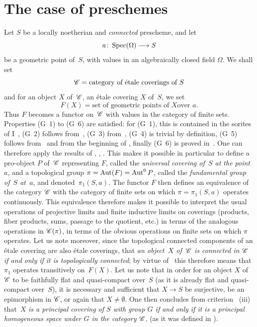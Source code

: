 \section{The case of preschemes}
\label{V.7}
Let $S$ be a locally noetherian and
\emph{connected} prescheme, and let
$$
a\colon \Spec(\Omega)\to S
$$
be a geometric point of~$S$, with values in an
algebraically closed field $\Omega$. We shall set
$$
\cal{C}=\text{category of \'etale coverings of~$S$}
$$
and for an object $X$ of~$\cal{C}$, \ie an \'etale covering
$X$ of~$S$, we set
$$
F(X)=\text{set of geometric points of~$X$
over~$a$.}
$$
Thus $F$ becomes a functor on~$\cal{C}$ with values in the
category of finite sets. Properties (G~1) to
(G~6) are satisfied: for (G~1), this is contained in the sorites of
I~, (G~2) follows from~, (G~3) from~,
(G~4) is trivial by definition, (G~5) follows from~ and
from the beginning of \No {}, finally (G~6) is proved in~. One
can therefore apply the results of \No {}, , . This makes it
possible in particular to define a pro-object $P$ of~$\cal{C}$
representing $F$, called the \emph{universal covering of~$S$
at the point~$a$},
and a topological group $\pi=\operatorname{Aut}(F)=\operatorname{Aut}^0 P$, called the
\emph{fundamental group of~$S$ at~$a$},
and denoted~$\pi_1(S,a)$.
The functor $F$ then defines an equivalence of the
category $\cal{C}$ with the category of finite sets
on which $\pi=\pi_1(S,a)$ operates continuously. This
equivalence therefore makes it possible to interpret the usual
operations of projective limits and finite inductive limits on
coverings (products, fiber products, sums, passage to the
quotient, etc.) in terms of the analogous operations in
$\cal{C}(\pi)$, \ie in terms of the obvious operations on
finite sets on which $\pi$ operates. Let us note moreover, since
the topological connected components of an \'etale covering
are also \'etale coverings, that \emph{an \hbox{object $X$} of~$\cal{C}$ is connected in $\cal{C}$ if and only if it is
topologically connected}; by virtue of~ this therefore means
that $\pi_1$ operates transitively on~$F(X)$.
Let us note that in order for an object $X$ of~$\cal{C}$ to be faithfully flat
and quasi-compact over~$S$ (as it is already flat and
quasi-compact over~$S$), it is necessary and sufficient that $X\to S$ be surjective,
\ie be an epimorphism in $\cal{C}$, or again that $X\neq
\emptyset$. One then concludes from criterion ~(iii) that~$X$
\emph{is a principal covering of
$S$
with group $G$ if and only if it is a principal homogeneous space
under $G$ in the category $\cal{C}$}, (as it was
defined in \No {}).

